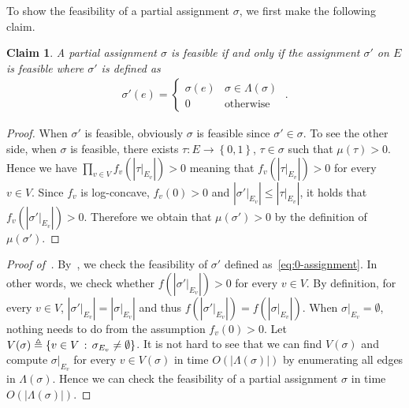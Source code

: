 \documentclass[11pt]{article}
\newtheorem{claim}[theorem]{Claim}
\newcommand{\abs}[1]{\left\vert#1\right\vert}
\newcommand{\set}[1]{\left\{#1\right\}}
\newcommand{\defeq}{\triangleq} \renewcommand{\d}{\,\-d}
\begin{document}
To show the feasibility of a partial assignment $\sigma$, we first make the following claim.
\begin{claim} \label{claim:partial-assignment-feasibility}
    A partial assignment $\sigma$ is feasible if and only if the assignment $\sigma'$ on $E$ is feasible where $\sigma'$ is defined as
    \begin{align} \label{eq:0-assignment}
        \sigma'(e) = \begin{cases}
            \sigma(e) & \sigma \in \Lambda(\sigma) \\
            0 & \mbox{otherwise}
        \end{cases}\;.
    \end{align}
\end{claim}
\begin{proof}
    When $\sigma'$ is feasible, obviously $\sigma$ is feasible since $\sigma' \in \sigma$. To see the other side, when $\sigma$ is feasible, there exists $\tau : E \to \set{0, 1}$, $\tau \in \sigma$ such that $\mu(\tau) > 0$. Hence we have $\prod_{v \in V} f_v\left(\abs{\tau \vert_{E_v}}\right) > 0$ meaning that $f_v\left(\abs{\tau \vert_{E_v}}\right) > 0$ for every $v \in V$. Since $f_v$ is log-concave, $f_v(0) > 0$ and $\abs{\sigma' \vert_{E_v}} \le \abs{\tau \vert_{E_v}}$, it holds that $f_v\left(\abs{\sigma' \vert_{E_v}}\right) > 0$. Therefore we obtain that $\mu(\sigma') > 0$ by the definition of $\mu(\sigma')$.
\end{proof}

\begin{proof}[Proof of~]
    By~, we check the feasibility of $\sigma'$ defined as~\eqref{eq:0-assignment}. In other words, we check whether $f\left(\abs{\sigma'\vert_{E_v}}\right) > 0$ for every $v \in V$. By definition, for every $v \in V$, $\abs{\sigma' \vert_{E_v}} = \abs{\sigma \vert_{E_v}}$ and thus $f\left(\abs{\sigma' \vert_{E_v}}\right) = f\left(\abs{\sigma \vert_{E_v}}\right)$. When $\sigma \vert_{E_v} = \emptyset$, nothing needs to do from the assumption $f_v(0) > 0$. Let $V(\sigma) \defeq \set{v \in V \cmid \sigma_{E_v} \neq \emptyset}$. It is not hard to see that we can find $V(\sigma)$ and compute $\sigma \vert_{E_v}$ for every $v \in V(\sigma)$ in time $O(\abs{\Lambda(\sigma)})$ by enumerating all edges in $\Lambda(\sigma)$. Hence we can check the feasibility of a partial assignment $\sigma$ in time $O(\abs{\Lambda(\sigma)})$. 
\end{proof}
\end{document}
